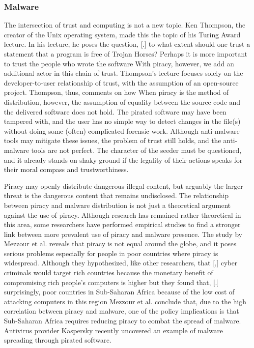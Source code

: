 \documentclass[onecolumn, 12pt]{article}
\begin{document}
\subsubsection{Malware}
The intersection of trust and computing is not a new topic. Ken Thompson, the
creator of the Unix operating system, made this the topic of his Turing Award
lecture. In his lecture, he poses the question,
[.]{%
  to what extent should one trust a statement that
  a program is free of Trojan Horses? Perhaps it is more important to trust the
  people who wrote the software%
} With piracy, however, we add an additional actor in this chain of trust.
Thompson's lecture focuses solely on the developer-to-user relationship of
trust, with the assumption of an open-source project. Thompson, thus, comments
on how  When piracy is the method of distribution, however, the assumption of
equality between the source code and the delivered software does not hold. The
pirated software may have been tampered with, and the user has no simple way to
detect changes in the file(s) without doing some (often) complicated forensic
work. Although anti-malware tools may mitigate these issues, the problem of
trust still holds, and the anti-malware tools are not perfect. The character of
the seeder must be questioned, and it already stands on shaky ground if the
legality of their actions speaks for their moral compass and trustworthiness.

Piracy may openly distribute dangerous illegal content, but arguably the
larger threat is the dangerous content that remains undisclosed. 
The relationship between piracy and malware distribution is not just a
theoretical argument against the use of piracy. Although research has remained
rather theoretical in this area, some researchers have performed empirical
studies to find a stronger link between more prevalent use of piracy and
malware presence. The study by Mezzour et al. reveals that piracy is not equal
around the globe, and it poses serious problems especially for people in
poor countries where piracy is widespread. Although they hypothesized, like
other researchers, that [,]{%
  cyber criminals would target rich countries because the monetary benefit of
  compromising rich people's computers is higher
} but they found that, [.]{%
  surprisingly, poor countries in Sub-Saharan Africa because of the low cost of
  attacking computers in this region%
} Mezzour et al. conclude that, due to the high correlation between piracy
and malware, one of the policy implications is that Sub-Saharan Africa requires
reducing piracy to combat the spread of malware.
Antivirus provider Kaspersky recently uncovered an example of malware spreading
through pirated software.~\cite{pcmag:malware}
\end{document}

